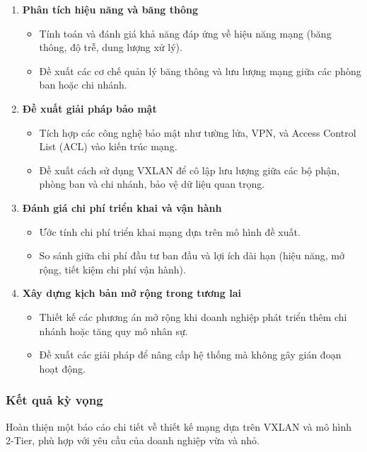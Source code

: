 \documentclass[13pt]{article}
\begin{document}
\begin{enumerate}
        \item \textbf{Phân tích hiệu năng và băng thông}
        \begin{itemize}
            \item Tính toán và đánh giá khả năng đáp ứng về hiệu năng mạng (băng thông, độ trễ, dung lượng xử lý).
            \item Đề xuất các cơ chế quản lý băng thông và lưu lượng mạng giữa các phòng ban hoặc chi nhánh.
        \end{itemize}

        \item \textbf{Đề xuất giải pháp bảo mật}
        \begin{itemize}
            \item Tích hợp các công nghệ bảo mật như tường lửa, VPN, và Access Control List (ACL) vào kiến trúc mạng.
            \item Đề xuất cách sử dụng VXLAN để cô lập lưu lượng giữa các bộ phận, phòng ban và chi nhánh, bảo vệ dữ liệu quan trọng.
        \end{itemize}

        \item \textbf{Đánh giá chi phí triển khai và vận hành}
        \begin{itemize}
            \item Ước tính chi phí triển khai mạng dựa trên mô hình đề xuất.
            \item So sánh giữa chi phí đầu tư ban đầu và lợi ích dài hạn (hiệu năng, mở rộng, tiết kiệm chi phí vận hành).
        \end{itemize}

        \item \textbf{Xây dựng kịch bản mở rộng trong tương lai}
        \begin{itemize}
            \item Thiết kế các phương án mở rộng khi doanh nghiệp phát triển thêm chi nhánh hoặc tăng quy mô nhân sự.
            \item Đề xuất các giải pháp để nâng cấp hệ thống mà không gây gián đoạn hoạt động.
        \end{itemize}
    
    \end{enumerate}

    \subsubsection{Kết quả kỳ vọng}
    Hoàn thiện một báo cáo chi tiết về thiết kế mạng dựa trên VXLAN và mô hình 2-Tier, phù hợp với yêu cầu của doanh nghiệp vừa và nhỏ.
    
\end{document}
